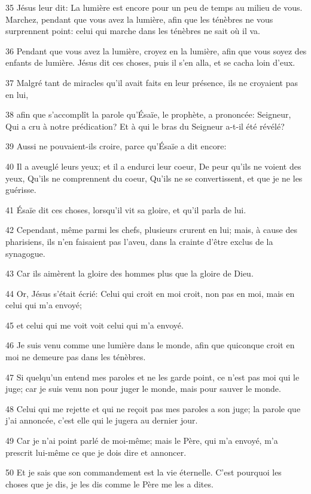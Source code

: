 \par 35 Jésus leur dit: La lumière est encore pour un peu de temps au milieu de vous. Marchez, pendant que vous avez la lumière, afin que les ténèbres ne vous surprennent point: celui qui marche dans les ténèbres ne sait où il va.
\par 36 Pendant que vous avez la lumière, croyez en la lumière, afin que vous soyez des enfants de lumière. Jésus dit ces choses, puis il s'en alla, et se cacha loin d'eux.
\par 37 Malgré tant de miracles qu'il avait faits en leur présence, ils ne croyaient pas en lui,
\par 38 afin que s'accomplît la parole qu'Ésaïe, le prophète, a prononcée: Seigneur, Qui a cru à notre prédication? Et à qui le bras du Seigneur a-t-il été révélé?
\par 39 Aussi ne pouvaient-ils croire, parce qu'Ésaïe a dit encore:
\par 40 Il a aveuglé leurs yeux; et il a endurci leur coeur, De peur qu'ils ne voient des yeux, Qu'ils ne comprennent du coeur, Qu'ils ne se convertissent, et que je ne les guérisse.
\par 41 Ésaïe dit ces choses, lorsqu'il vit sa gloire, et qu'il parla de lui.
\par 42 Cependant, même parmi les chefs, plusieurs crurent en lui; mais, à cause des pharisiens, ils n'en faisaient pas l'aveu, dans la crainte d'être exclus de la synagogue.
\par 43 Car ils aimèrent la gloire des hommes plus que la gloire de Dieu.
\par 44 Or, Jésus s'était écrié: Celui qui croit en moi croit, non pas en moi, mais en celui qui m'a envoyé;
\par 45 et celui qui me voit voit celui qui m'a envoyé.
\par 46 Je suis venu comme une lumière dans le monde, afin que quiconque croit en moi ne demeure pas dans les ténèbres.
\par 47 Si quelqu'un entend mes paroles et ne les garde point, ce n'est pas moi qui le juge; car je suis venu non pour juger le monde, mais pour sauver le monde.
\par 48 Celui qui me rejette et qui ne reçoit pas mes paroles a son juge; la parole que j'ai annoncée, c'est elle qui le jugera au dernier jour.
\par 49 Car je n'ai point parlé de moi-même; mais le Père, qui m'a envoyé, m'a prescrit lui-même ce que je dois dire et annoncer.
\par 50 Et je sais que son commandement est la vie éternelle. C'est pourquoi les choses que je dis, je les dis comme le Père me les a dites.

